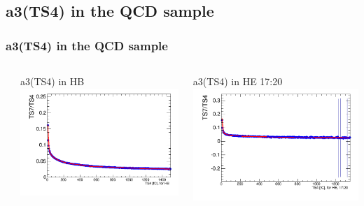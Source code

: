 \documentclass[bigger]{beamer}
\begin{document}
\subsection{a3(TS4) in the QCD sample}
\label{sec-3-7}
\begin{frame}
\frametitle{a3(TS4) in the QCD sample}
\label{sec-3-7-1}
\begin{columns} %
\label{sec-3-7-1-1}
\begin{column}{0.55\textwidth}
\label{sec-3-7-1-1-1}

\centering
a3(TS4) in HB
\includegraphics[width=1.0\textwidth]{fig/a3_ring0.png}
\end{column}
\begin{column}{0.55\textwidth}
\label{sec-3-7-1-1-2}

\centering
a3(TS4) in HE 17:20
\includegraphics[width=1.0\textwidth]{fig/a3_ring1.png}
\end{column}
\end{columns}
\end{frame}
\end{document}
